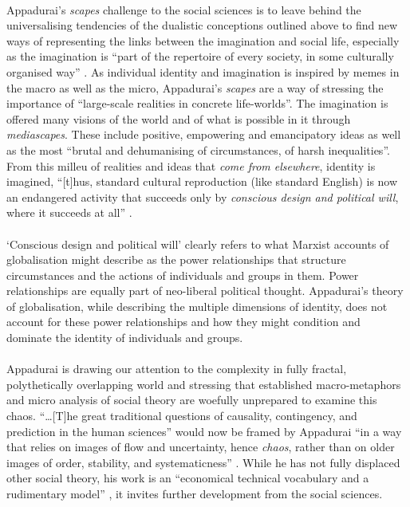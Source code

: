 \documentclass{article}
\begin{document}
\begin{doublespacing}
\paragraph{}Appadurai's \emph{scapes} challenge to the social sciences is to leave behind the universalising tendencies of the dualistic conceptions outlined above to find new ways of representing the links between the imagination and social life, especially as the imagination is ``part of the repertoire of every society, in some culturally organised way'' \cite[p. 53]{Appadurai:1996lp}. As individual identity and imagination is inspired by memes in the macro as well as the micro, Appadurai's \emph{scapes} are a way of stressing the importance of ``large-scale realities in concrete life-worlds''. The imagination is offered many visions of the world and of what is possible in it through \emph{mediascapes}. These include positive, empowering and emancipatory ideas as well as the most ``brutal and dehumanising of circumstances, of harsh inequalities''. From this milleu of realities and ideas that \emph{come from elsewhere}, identity is imagined, ``[t]hus, standard cultural reproduction (like standard English) is now an endangered activity that succeeds only by \emph{conscious design and political will}, where it succeeds at all'' \cite[p.53-55, emphasis added]{Appadurai:1996lp}.

\paragraph{}`Conscious design and political will' clearly refers to what Marxist accounts of globalisation might describe as the power relationships that structure circumstances and the actions of individuals and groups in them. Power relationships are equally part of neo-liberal political thought. Appadurai's theory of globalisation, while describing the multiple dimensions of identity, does not account for these power relationships and how they might condition and dominate the identity of individuals and groups.

\paragraph{}Appadurai is drawing our attention to the complexity in fully fractal, polythetically overlapping world and stressing that established macro-metaphors and micro analysis of social theory are woefully unprepared to examine this chaos. ``\ldots [T]he great traditional questions of causality, contingency, and prediction in the human sciences'' would now be framed by Appadurai ``in a way that relies on images of flow and uncertainty, hence \emph{chaos}, rather than on older images of order, stability, and systematicness'' \cite[p.46-47, original emphasis]{Appadurai:1996lp}. While he has not fully displaced other social theory, his work is an ``economical technical vocabulary and a rudimentary model'' \cite[p.47]{Appadurai:1996lp}, it invites further development from the social sciences.

\newpage
\end{doublespacing}

\end{document}
